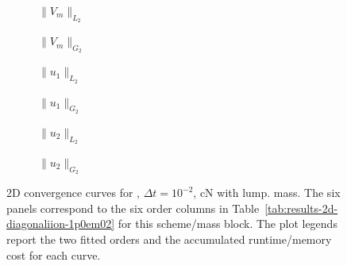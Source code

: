 \begin{figure}[p]
\centering
\begin{subfigure}{0.485\linewidth}
\centering
{}
\caption{$\|V_m\|_{L_2}$}
\label{fig:results-2d-diagonaliion-1p0em02-cranknicolson-lumped-a}
\end{subfigure}
\hfill
\begin{subfigure}{0.485\linewidth}
\centering
{}
\caption{$\|V_m\|_{G_2}$}
\label{fig:results-2d-diagonaliion-1p0em02-cranknicolson-lumped-b}
\end{subfigure}
\par\vspace{0.8em}
\begin{subfigure}{0.485\linewidth}
\centering
{}
\caption{$\|u_1\|_{L_2}$}
\label{fig:results-2d-diagonaliion-1p0em02-cranknicolson-lumped-c}
\end{subfigure}
\hfill
\begin{subfigure}{0.485\linewidth}
\centering
{}
\caption{$\|u_1\|_{G_2}$}
\label{fig:results-2d-diagonaliion-1p0em02-cranknicolson-lumped-d}
\end{subfigure}
\par\vspace{0.8em}
\begin{subfigure}{0.485\linewidth}
\centering
{}
\caption{$\|u_2\|_{L_2}$}
\label{fig:results-2d-diagonaliion-1p0em02-cranknicolson-lumped-e}
\end{subfigure}
\hfill
\begin{subfigure}{0.485\linewidth}
\centering
{}
\caption{$\|u_2\|_{G_2}$}
\label{fig:results-2d-diagonaliion-1p0em02-cranknicolson-lumped-f}
\end{subfigure}
\caption{2D convergence curves for , $\Delta t=10^{-2}$, cN with lump. mass. The six panels correspond to the six order columns in Table~\ref{tab:results-2d-diagonaliion-1p0em02} for this scheme/mass block. The plot legends report the two fitted orders and the accumulated runtime/memory cost for each curve.}
\label{fig:results-2d-diagonaliion-1p0em02-cranknicolson-lumped}
\end{figure}
\FloatBarrier

